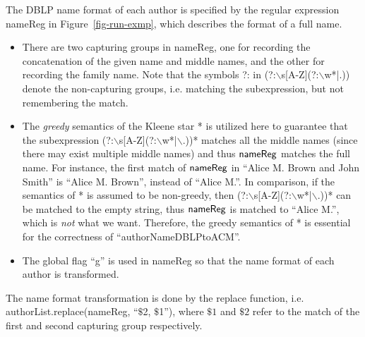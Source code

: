 The DBLP name format of each author is specified by the regular expression {\sf nameReg}  in Figure~\ref{fig-run-exmp}, which describes the format of a full name.
\begin{itemize}
\item There are two capturing groups in {\sf nameReg}, one for recording the concatenation of the given name and middle names, and the other for recording the family name. 
Note that the symbols ?: in (?:$\backslash$s[A-Z](?:$\backslash$w*|.)) denote the non-capturing groups, i.e. matching the subexpression, but not remembering the match.
%
 
\item The \emph{greedy} semantics of the Kleene star * is utilized here to guarantee that the subexpression (?:$\backslash$s[A-Z](?:$\backslash$w*|$\backslash$.))* matches all the middle names (since there may exist multiple middle names) and thus ${\sf nameReg}$ matches the full name. For instance, the first match of ${\sf nameReg}$ in  ``Alice M. Brown and John Smith'' is ``Alice M. Brown'', instead of ``Alice M.''. In comparison, if the semantics of * is assumed to be non-greedy, then (?:$\backslash$s[A-Z](?:$\backslash$w*|$\backslash$.))* can be matched to the empty string, thus ${\sf nameReg}$ is matched to ``Alice M.'', which is \emph{not} what we want. Therefore, the greedy semantics of * is essential for the correctness of ``authorNameDBLPtoACM''.
%
\item The global flag ``g'' is used in {\sf nameReg} so that the name format of each author is transformed. 
\end{itemize}
The name format transformation is done by the {\sf replace} function, i.e. {\sf authorList.replace(nameReg, ``$\$$2, $\$$1'')}, where $\$1$ and $\$2$ refer to the match of the first and second capturing group respectively. 


